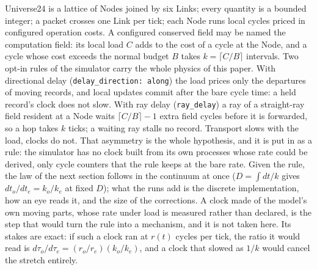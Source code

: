 \documentclass[11pt]{article}
\begin{document}
Universe24 is a lattice of Nodes joined by six Links; every quantity is a
bounded integer; a packet crosses one Link per tick; each Node runs local
cycles priced in configured operation costs. A configured conserved field
may be named the computation field: its local load $C$ adds to the cost of
a cycle at the Node, and a cycle whose cost exceeds the normal budget $B$
takes $k = \lceil C / B \rceil$ intervals. Two opt-in rules of the simulator
carry the whole physics of this paper. With directional delay
(\texttt{delay\_direction: along}) the load prices only the departures of
moving records, and local updates commit after the bare cycle time: a held
record's clock does not slow. With ray delay (\texttt{ray\_delay}) a ray of
a straight-ray field resident at a Node waits $\lceil C/B \rceil - 1$ extra
field cycles before it is forwarded, so a hop takes $k$ ticks; a waiting ray
stalls no record. Transport slows with the load, clocks do not. That
asymmetry is the whole hypothesis, and it is put in as a rule: the
simulator has no clock built from its own processes whose rate could be
derived, only cycle counters that the rule keeps at the bare rate. Given
the rule, the law of the next section follows in the continuum at once
($D = \int dt/k$ gives $dt_o/dt_e = k_o/k_e$ at fixed $D$); what the runs
add is the discrete implementation, how an eye reads it, and the size of
the corrections. A clock made of the model's own moving parts, whose rate
under load is measured rather than declared, is the step that would turn
the rule into a mechanism, and it is not taken here. Its stakes are
exact: if such a clock ran at $r(t)$ cycles per tick, the ratio it would
read is $d\tau_o/d\tau_e = (r_o/r_e)(k_o/k_e)$, and a clock that slowed as
$1/k$ would cancel the stretch entirely.
\end{document}
